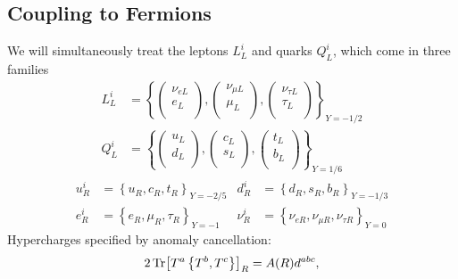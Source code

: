 
\subsection{Coupling to Fermions}%
\label{sub:coupling_to_fermions}

We will simultaneously treat the leptons $L^{i}_L$ and quarks $Q^{i}_L$, which come in three families
\begin{align}
  L^{i}_L &=
  \left\{ 
    \begin{pmatrix}
    \nu_{e L} \\
    e_L \\
    \end{pmatrix}
    ,
    \begin{pmatrix}
    \nu_{\mu L} \\
    \mu_L \\
    \end{pmatrix}
    ,
    \begin{pmatrix}
    \nu_{\tau L} \\
    \tau_L \\
    \end{pmatrix}
  \right\}_{Y = - 1 / 2} \\
  Q^{i}_L &=
  \left\{ 
    \begin{pmatrix}
    u_{L} \\
    d_L \\
    \end{pmatrix}
    ,
    \begin{pmatrix}
    c_{L} \\
    s_L \\
    \end{pmatrix}
    ,
    \begin{pmatrix}
    t_{L} \\
    b_L \\
    \end{pmatrix}
  \right\}_{Y = 1 / 6}
\end{align}
\begin{align}
  u^{i}_R &= \left\{ u_R, c_R, t_R \right\}_{Y = -2 / 5} & d_R^{i} &= \left\{ d_R, s_R, b_R \right\}_{Y = -1 / 3} \\
  e^{i}_R &= \left\{ e_R, \mu_R, \tau_R \right\}_{Y = -1} & \nu_R^{i} &= \left\{ \nu_{e R}, \nu_{\mu R}, \nu_{\tau R} \right\}_{Y = 0}
\end{align}
Hypercharges specified by anomaly cancellation:
\begin{equation}
  2 \Tr[T^{a} \left\{ T^{b}, T^{c} \right\}]_R = A(R) d^{abc},
\end{equation}
